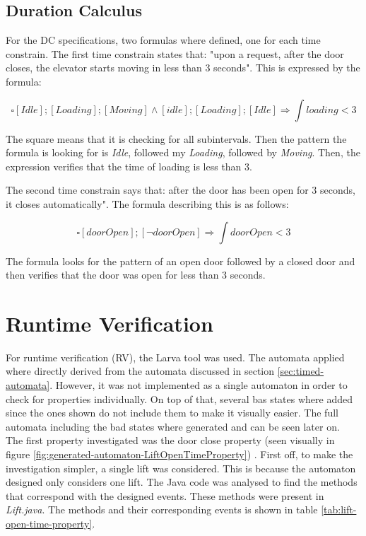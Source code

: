 \documentclass[a4paper, 12pt]{article}
\begin{document}
\subsection{Duration Calculus}
For the DC specifications, two formulas where defined, one for each time constrain. The first time constrain states that: "upon a request, after the door closes, the elevator starts moving in less than 3 seconds". This is expressed by the formula:

$$\square [Idle] ; [Loading] ;  [Moving]  \wedge [idle] ; [Loading] ; [Idle] \Rightarrow \int loading < 3$$

The square means that it is checking for all subintervals. Then the pattern the formula is looking for is \textit{Idle}, followed my \textit{Loading}, followed by \textit{Moving}. Then, the expression verifies that the time of loading is less than 3.

The second time constrain says that: after the door has been open for 3 seconds, it closes automatically". The formula describing this is as follows:

$$\square [doorOpen] ; [\neg doorOpen] \Rightarrow \int doorOpen < 3$$

The formula looks for the pattern of an open door followed by a closed door and then verifies that the door was open for less than 3 seconds. 

\section{Runtime Verification}

For runtime verification (RV), the Larva tool was used. The automata applied where directly derived from the automata discussed in section \ref{sec:timed-automata}. However, it was not implemented as a single automaton in order to check for properties individually. On top of that, several bas states where added since the ones shown do not include them to make it visually easier. The full automata including the bad states where generated and can be seen later on. \\

The first property investigated was the door close property (seen visually in figure \ref{fig:generated-automaton-LiftOpenTimeProperty}) . First off, to make the investigation simpler, a single lift was considered. This is because the automaton designed only considers one lift. The Java code was analysed to find the methods that correspond with the designed events. These methods were present in \textit{Lift.java}. The methods and their corresponding events is shown in table \ref{tab:lift-open-time-property}. \\
\end{document}
